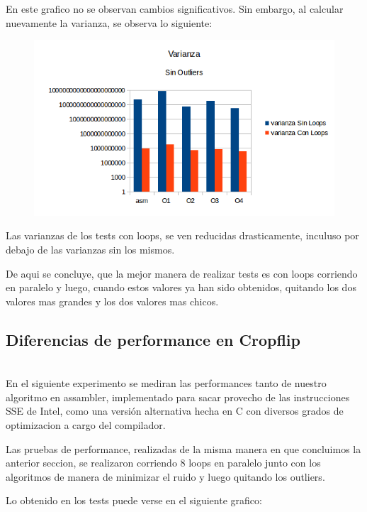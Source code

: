 \documentclass[a4paper]{article}
\begin{document}
En este grafico no se observan cambios significativos. Sin embargo, al calcular nuevamente la varianza, se observa lo siguiente:

\begin{figure}[h!]
  \begin{center}
	\includegraphics[scale=0.7]{GraficosTesting/crop/VSO.png}
	\label{nombreparareferenciar}
  \end{center}
\end{figure}

Las varianzas de los tests con loops, se ven reducidas drasticamente, inculuso por debajo de las varianzas sin los mismos.

De aqui se concluye, que la mejor manera de realizar tests es con loops corriendo en paralelo y luego, cuando estos valores ya han sido obtenidos, quitando los dos valores mas grandes y los dos valores mas chicos.

\newpage
\subsection{Diferencias de performance en Cropflip}
\\
En el siguiente experimento se mediran las performances tanto de nuestro algoritmo en assambler, implementado para sacar provecho de las instrucciones SSE de Intel, como una versión alternativa hecha en C con diversos grados de optimizacion a cargo del compilador.

Las pruebas de performance, realizadas de la misma manera en que concluimos la anterior seccion, se realizaron corriendo 8 loops en paralelo junto con los algoritmos de manera de minimizar el ruido y luego quitando los outliers.

Lo obtenido en los tests puede verse en el siguiente grafico:
\end{document}
